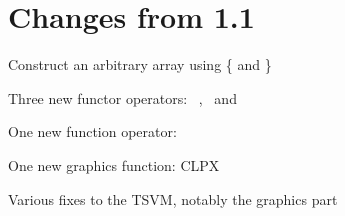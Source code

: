 \chapter{Changes from 1.1}

\begin{itemlist}
\item Construct an arbitrary array using \{ and \}
\item Three new functor operators: \basicinfixmap\ , \basiccurrymap\ and \basicseqapp
\item One new function operator: \basicpipe
\item One new graphics function: CLPX
\item Various fixes to the TSVM, notably the graphics part
\end{itemlist}
